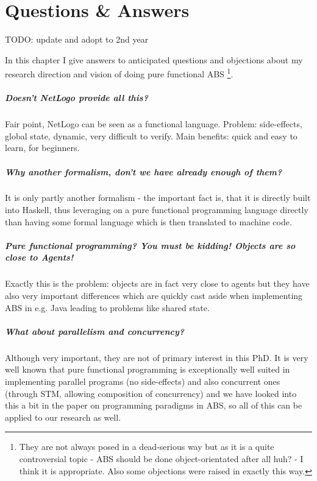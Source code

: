 \chapter{Questions \& Answers}
\label{chap:qa}

TODO: update and adopt to 2nd year

In this chapter I give answers to anticipated questions and objections about my research direction and vision of doing pure functional ABS \footnote{They are not always posed in a dead-serious way but as it is a quite controversial topic - ABS should be done object-orientated after all huh? - I think it is appropriate. Also some objections were raised in exactly this way.}.

\paragraph{Doesn't NetLogo provide all this?}
Fair point, NetLogo can be seen as a functional language. Problem: side-effects, global state, dynamic, very difficult to verify. Main benefits: quick and easy to learn, for beginners.

\paragraph{Why another formalism, don't we have already enough of them?}
It is only partly another formalism - the important fact is, that it is directly built into Haskell, thus leveraging on a pure functional programming language directly than having some formal language which is then translated to machine code.

\paragraph{Pure functional programming? You must be kidding! Objects are so close to Agents!}
Exactly this is the problem: objects are in fact very close to agents but they have also very important differences which are quickly cast aside when implementing ABS in e.g. Java leading to problems like shared state.

\paragraph{What about parallelism and concurrency?}
Although very important, they are not of primary interest in this PhD. It is very well known that pure functional programming is exceptionally well suited in implementing parallel programs (no side-effects) and also concurrent ones (through STM, allowing composition of concurrency) and we have looked into this a bit in the paper on programming paradigms in ABS, so all of this can be applied to our research as well.

